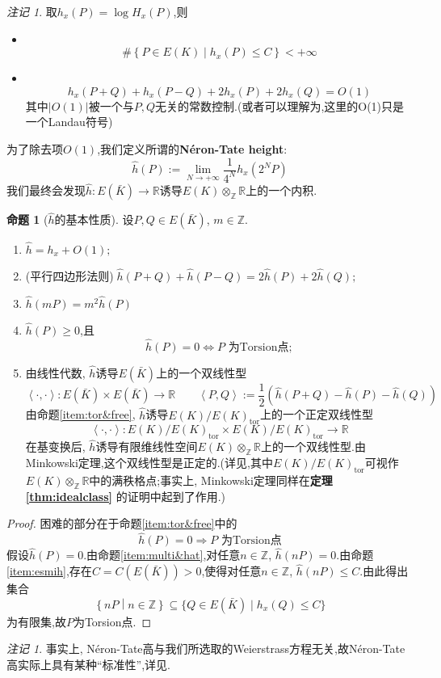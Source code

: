 \documentclass[12pt,A4paper,oneside,reqno]{amsart}
\numberwithin{equation}{section}
\theoremstyle{definition}
\newtheorem{proposition}[theorem]{命题}
\theoremstyle{plain}
\theoremstyle{plain}
\numberwithin{equation}{section}
\theoremstyle{remark}
\newtheorem{remark}[theorem]{注记}
\DeclareMathOperator{\tor}{\operatorname{tor}}
\begin{document}
\begin{remark}
	取$h_x(P)=\log H_x(P)$,则
	\begin{itemize}
		\item\phantom{1}\\[-1.2cm] $$\#\left\{P \in E(K) \middle| h_x(P) \leqslant C\right\}< +\infty$$
		\item\phantom{1}\\[-1.2cm] $$h_x(P+Q)+h_x(P-Q)+2h_x(P)+2h_x(Q)=O(1)$$
		其中$|O(1)|$被一个与$P,Q$无关的常数控制.(或者可以理解为,这里的O(1)只是一个Landau符号)
	\end{itemize}
为了除去项$O(1)$,我们定义所谓的\textbf{Néron-Tate height}:
$$\hat{h}(P):=\lim_{N \rightarrow +\infty}\frac{1}{4^N}h_x(2^NP)$$
我们最终会发现$\hat{h}:E(\bar{K}) \longrightarrow \mathbb{R}$诱导$E(K) \otimes_{\mathbb{Z}}\mathbb{R}$上的一个内积.
\begin{proposition}[$\hat{h}$的基本性质]
	设$P,Q \in E(\bar{K})$, $m \in \mathbb{Z}$.
	\begin{enumerate}[1.]
		\item \label{item:esmih} $\hat{h}=h_x+O(1);$
		\item (平行四边形法则)$\;\hat{h}(P+Q)+\hat{h}(P-Q)=2\hat{h}(P)+2\hat{h}(Q);$
		\item\label{item:multi&hat} $\hat{h}(mP)=m^2\hat{h}(P)$
		\item\label{item:tor&free}$\hat{h}(P)\geqslant 0$,且
		$$\hat{h}(P)=0 \Longleftrightarrow P \text{ 为Torsion点};$$
		\item 由线性代数, $\hat{h}$诱导$E(\bar{K})$上的一个双线性型
		$$\left<\cdot,\cdot\right>:E(\bar{K}) \times E(\bar{K}) \longrightarrow \mathbb{R} \qquad \left<P,Q\right>:=\frac{1}{2}\left(\hat{h}(P+Q)-\hat{h}(P)-\hat{h}(Q)\right)$$
		由命题\ref{item:tor&free}, $\hat{h}$诱导$E(K)/E(K)_{\tor}$上的一个正定双线性型
		$$\left<\cdot,\cdot\right>:E(K)/E(K)_{\tor} \times E(K)/E(K)_{\tor} \longrightarrow \mathbb{R}$$
		在基变换后, $\hat{h}$诱导有限维线性空间$E(K)\otimes_{\mathbb{Z}}\mathbb{R}$上的一个双线性型.由Minkowski定理,这个双线性型是正定的.(详见\cite[p131, Theorem 6.17]{milne2006elliptic},其中$E(K)/E(K)_{\tor}$可视作$E(K)\otimes_{\mathbb{Z}}\mathbb{R}$中的满秩格点;事实上, Minkowski定理同样在\textbf{定理 \ref{thm:idealclass}} 的证明中起到了作用.)
	\end{enumerate}
\end{proposition}
	\begin{proof}
	困难的部分在于命题\ref{item:tor&free}中的
	$$\hat{h}(P)=0 \Longrightarrow P \text{ 为Torsion点}$$
	假设$\hat{h}(P)=0$.由命题\ref{item:multi&hat},对任意$n \in \mathbb{Z}$, $\hat{h}(nP)=0$.由命题\ref{item:esmih},存在$C=C(E(\bar{K})) >0$,使得对任意$n \in \mathbb{Z}$, $\hat{h}(nP)\leqslant C$.由此得出集合
	$$\left\{nP \middle| n \in \mathbb{Z} \right\} \subseteq \{Q \in E(\bar{K})\mid h_x(Q)\leqslant C \}$$
	为有限集,故$P$为Torsion点.
\end{proof}
\begin{remark}
	事实上, Néron-Tate高与我们所选取的Weierstrass方程无关,故Néron-Tate高实际上具有某种“标准性”,详见\cite[Theorem 9.3,(e)]{tate1974the}.
\end{remark}
\end{remark}
\end{document}
